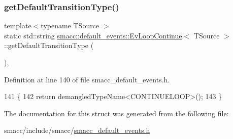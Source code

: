 \subsubsection{\texorpdfstring{get\+Default\+Transition\+Type()}{getDefaultTransitionType()}}
{\footnotesize\ttfamily template$<$typename T\+Source $>$ \\
static std\+::string \hyperlink{structsmacc_1_1default__events_1_1EvLoopContinue}{smacc\+::default\+\_\+events\+::\+Ev\+Loop\+Continue}$<$ T\+Source $>$\+::get\+Default\+Transition\+Type (\begin{DoxyParamCaption}{ }\end{DoxyParamCaption})\hspace{0.3cm}{\ttfamily [inline]}, {\ttfamily [static]}}



Definition at line 140 of file smacc\+\_\+default\+\_\+events.\+h.


\begin{DoxyCode}
141   \{
142     \textcolor{keywordflow}{return} demangledTypeName<CONTINUELOOP>();
143   \}
\end{DoxyCode}


The documentation for this struct was generated from the following file\+:\begin{DoxyCompactItemize}
\item 
smacc/include/smacc/\hyperlink{smacc__default__events_8h}{smacc\+\_\+default\+\_\+events.\+h}\end{DoxyCompactItemize}

